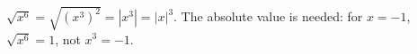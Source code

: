 $\sqrt{x^6}=\sqrt{(x^3)^2}=\left|x^3\right|=\boxed{|x|^3}$. The absolute value is needed: for $x=-1$, $\sqrt{x^6}=1$, not $x^3=-1$.
